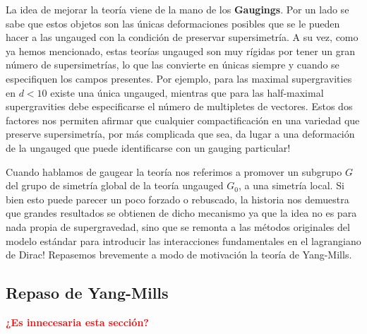 \documentclass{article}
\numberwithin{equation}{section}
\begin{document}
La idea de mejorar la teoría viene de la mano de los \textbf{Gaugings}. Por un lado se sabe que estos objetos son las únicas deformaciones posibles que se le pueden hacer a las ungauged con la condición de preservar supersimetría. 
A su vez, como ya hemos mencionado, estas teorías ungauged son muy rígidas por tener un gran número de supersimetrías, lo que las convierte en únicas siempre y cuando se especifiquen los campos presentes. Por ejemplo, para las maximal supergravities en $ d<10 $ existe una única ungauged, mientras que para las half-maximal supergravities debe especificarse el número de multipletes de vectores.
Estos dos factores nos permiten afirmar que cualquier compactificación en una variedad que preserve supersimetría, por más complicada que sea, da lugar a una deformación de la ungauged que puede identificarse con un gauging particular!

Cuando hablamos de gaugear la teoría nos referimos a promover un subgrupo $ G $ del grupo de simetría global de la teoría ungauged $ G_0 $, a una simetría local. Si bien esto puede parecer un poco forzado o rebuscado, la historia nos demuestra que grandes resultados se obtienen de dicho mecanismo ya que la idea no es para nada propia de supergravedad, sino que se remonta a las métodos originales del modelo estándar para introducir las interacciones fundamentales en el lagrangiano de Dirac! Repasemos brevemente a modo de motivación la teoría de Yang-Mills.


\subsection{Repaso de Yang-Mills}

\textcolor{red}{\textbf{¿Es innecesaria esta sección?}}
\end{document}
